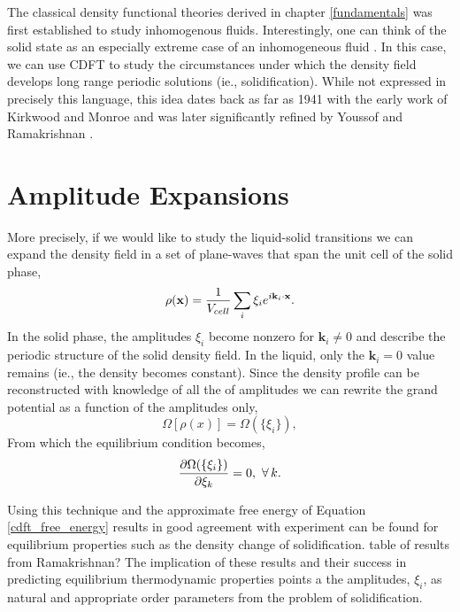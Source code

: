 \label{dft_of_freezing}

The classical density functional theories derived in chapter
\ref{fundamentals} was first established to study inhomogenous fluids.
Interestingly, one can think of the solid state as an especially extreme
case of an inhomogeneous fluid \cite{HANSEN-CH6}.  In this case, we can
use CDFT to study the circumstances under which the density field develops
long range periodic solutions (ie., solidification).  While not expressed
in precisely this language, this idea dates back as far as 1941 with the
early work of Kirkwood and Monroe \cite{KIRKWOOD_MONROE41} and was later
significantly refined by Youssof and Ramakrishnan \cite{RAMAKRISHNAN79}.

\section{Amplitude Expansions} %

More precisely, if we would like to study the liquid-solid transitions we
can expand the density field in a set of plane-waves that span the unit
cell of the solid phase,
%
\begin{equation}
    \rho(\mathbf{x}) = \frac{1}{V_{cell}} 
        \sum_i \xi_i e^{i\mathbf{k}_i \cdot \mathbf{x}}.
\end{equation}
%
In the solid phase, the amplitudes $\xi_i$ become nonzero for
$\mathbf{k}_i \ne 0$ and describe the periodic structure of the solid
density field.  In the liquid, only the $\mathbf{k}_i = 0$ value remains
(ie., the density becomes constant).  Since the density profile can be
reconstructed with knowledge of all the of amplitudes we can rewrite the
grand potential as a function of the amplitudes only, 
%
\begin{equation}
    \Omega[\rho(x)] = \Omega(\lbrace\xi_i\rbrace),
\end{equation}
%
From which the equilibrium condition becomes,
%
\begin{equation}
    \frac{\partial \Omega(\lbrace\xi_i\rbrace)}{\partial \xi_k}
        = 0, \,\,\forall \,k.  
\end{equation}
%

Using this technique and the approximate free energy of Equation
\ref{cdft_free_energy} results in good agreement with experiment can be found
for equilibrium properties such as the density change of solidification.
{\color{ForestGreen} table of results from Ramakrishnan? } The implication of
these results and their success in predicting equilibrium thermodynamic
properties points a the amplitudes, $\xi_i$, as natural and appropriate order
parameters from the problem of solidification. 

